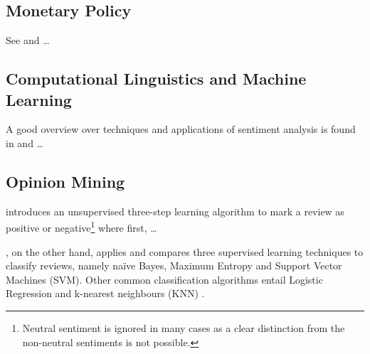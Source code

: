 
\subsection{Monetary Policy}

See \textcite{Mishkin.2007} and \textcite{Cecchetti.2006} \dots


\subsection{Computational Linguistics and Machine Learning}

A good overview over techniques and applications of sentiment analysis is found in \textcite{Feldman.2013} and \textcite{Liu.2012} \dots



\subsection{Opinion Mining}

\textcite{Turney.2002} introduces an unsupervised three-step learning algorithm to mark a review as positive or negative\footnote{Neutral sentiment is ignored in many cases as a clear distinction from the non-neutral sentiments is not possible.} where first, \dots


\textcite{Pang.2002}, on the other hand, applies and compares three supervised learning techniques to classify reviews, namely na\"{i}ve Bayes, Maximum Entropy and Support Vector Machines (SVM). Other common classification algorithms entail Logistic Regression and k-nearest neighbours (KNN) \parencite{Feldman.2013}.

